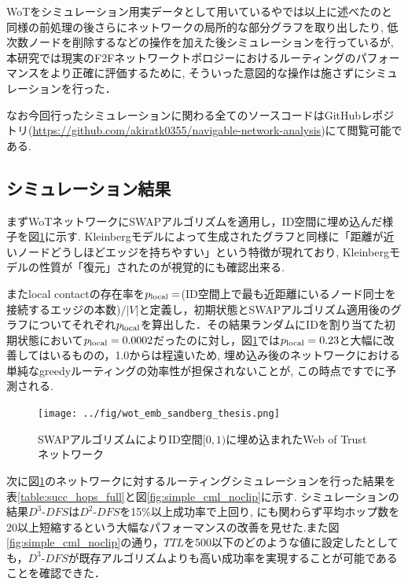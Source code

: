 \documentclass[technicalreport]{./ieicej-v3.0/UTF/ieicej}
\begin{document}
 WoTをシミュレーション用実データとして用いている\cite{sandberg2006distributed}や\cite{clarke2010private}では以上に述べたのと同様の前処理の後さらにネットワークの局所的な部分グラフを取り出したり, 低次数ノードを削除するなどの操作を加えた後シミュレーションを行っているが, 本研究では現実のF2Fネットワークトポロジーにおけるルーティングのパフォーマンスをより正確に評価するために, そういった意図的な操作は施さずにシミュレーションを行った．

なお今回行ったシミュレーションに関わる全てのソースコードはGitHubレポジトリ(\url{https://github.com/akiratk0355/navigable-network-analysis})にて閲覧可能である.

  \subsection{シミュレーション結果}
   まずWoTネットワークにSWAPアルゴリズムを適用し，ID空間に埋め込んだ様子を図\ref{fig:wot_emb}に示す. Kleinbergモデルによって生成されたグラフと同様に「距離が近いノードどうしほどエッジを持ちやすい」という特徴が現れており, Kleinbergモデルの性質が「復元」されたのが視覚的にも確認出来る.

   またlocal contactの存在率を$p_{\rm{local}}=$(ID空間上で最も近距離にいるノード同士を接続するエッジの本数)$/|V|$と定義し，初期状態とSWAPアルゴリズム適用後のグラフについてそれぞれ$p_{\rm{local}}$を算出した．その結果ランダムにIDを割り当てた初期状態において$p_{\rm{local}}=0.0002$だったのに対し，図\ref{fig:wot_emb}では$p_{\rm{local}} = 0.23$と大幅に改善してはいるものの，1.0からは程遠いため, 埋め込み後のネットワークにおける単純なgreedyルーティングの効率性が担保されないことが, この時点ですでに予測される.

   \begin{figure}[htb]
    \texttt{[image: ../fig/wot\_emb\_sandberg\_thesis.png]}
    \caption{SWAPアルゴリズムによりID空間$[0,1)$に埋め込まれたWeb of Trustネットワーク}
    \label{fig:wot_emb}
   \end{figure}

   次に図\ref{fig:wot_emb}のネットワークに対するルーティングシミュレーションを行った結果を表\ref{table:succ_hops_full}と図\ref{fig:simple_cml_noclip}に示す.  シミュレーションの結果$D^3$-$DFS$は$D^2$-$DFS$を15\%以上成功率で上回り, にも関わらず平均ホップ数を20以上短縮するという大幅なパフォーマンスの改善を見せた.また図\ref{fig:simple_cml_noclip}の通り，$TTL$を500以下のどのような値に設定したとしても，$D^3$-$DFS$が既存アルゴリズムよりも高い成功率を実現することが可能であることを確認できた．
\end{document}
